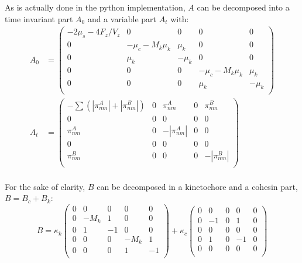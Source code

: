 \documentclass[a4paper,12pt]{article}
\begin{document}
\begin{itemize}
As is actually done in the python implementation,
$A$  can be decomposed into a time invariant part $A_0$ and a
variable part $A_t$ with:\\
\begin{equation}
  \begin{aligned}
    A_0 &=%
    \begin{pmatrix}
      - 2 \mu_s - 4 F_z/V_z & 0&0&0&0\\
      0 &  -\mu_c - M_k \mu_k& \mu_k & 0&0\\
      0 & \mu_k & - \mu_k & 0&0\\
      0&0&0 & -\mu_c - M_k \mu_k & \mu_k\\
      0&0&0 & \mu_k & - \mu_k\\
    \end{pmatrix}\\
    A_t &=%
    \begin{pmatrix}
      - \sum (|\pi_{nm}^A| + |\pi_{nm}^B|)& 0 & \pi_{nm}^A &%
      0 &  \pi_{nm}^B\\
      0&0&0&0&0\\
      \pi_{nm}^A & 0 & - |\pi_{nm}^A| & 0&0\\
      0&0&0&0&0\\
      \pi_{nm}^B & 0&0&0 & - |\pi_{nm}^B| \\
    \end{pmatrix}\\
  \end{aligned}
\end{equation}

For the sake of clarity, $B$ can be decomposed in a kinetochore and a
cohesin part, $B = B_c + B_k$:
\begin{equation}
  B = \kappa_k%
  \begin{pmatrix}
    0 & 0&0&0&0\\
    0 &  - M_k  & 1 & 0&0 \\
    0 & 1 & -1 &  0&0\\
    0 &  0&0 & - M_k  & 1 \\
    0&0&0  & 1 & - 1\\
  \end{pmatrix}
  + \kappa_c%
  \begin{pmatrix}
    0 & 0&0&0&0\\
    0 & - 1 & 0 & 1  & 0 \\
    0&0&0&0&0\\
    0 & 1 & 0 & -1 & 0 \\
    0&0&0&0&0\\
  \end{pmatrix}
\end{equation}
\end{itemize}
\end{document}
